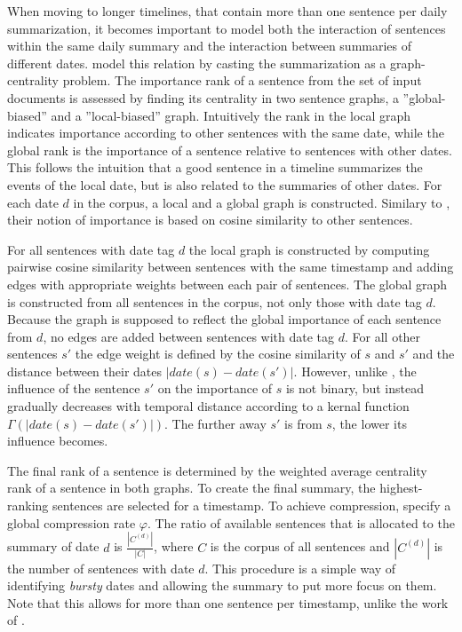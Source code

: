 \documentclass[a4paper,BCOR=10mm]{report}
\numberwithin{lemma}{chapter}
\numberwithin{definition}{chapter}
\begin{document}
When moving to longer timelines, that contain more than one sentence per daily summarization, it becomes important to model both the interaction of sentences within the same daily summary and the interaction between summaries of different dates.
\citet{yan-trans} model this relation by casting the summarization as a graph-centrality problem.
The importance rank of a sentence from the set of input documents is assessed by finding its centrality in two sentence graphs, a ''global-biased'' and a ''local-biased'' graph.
Intuitively the rank in the local graph indicates importance according to other sentences with the same date, while the global rank is the importance of a sentence relative to sentences with other dates. This follows the intuition that a good sentence in a timeline summarizes the events of the local date, but is also related to the summaries of other dates. For each date $d$ in the corpus, a local and a global graph is constructed.
Similary to \citet{chieu}, their notion of importance is based on cosine similarity to other sentences.

For all sentences with date tag $d$ the local graph is constructed by computing pairwise cosine similarity between sentences with the same timestamp and adding edges with appropriate weights between each pair of sentences.
The global graph is constructed from all sentences in the corpus, not only those with date tag $d$. Because the graph is supposed to reflect the global importance of each sentence from $d$, no edges are added between sentences with date tag $d$.
For all other sentences $s'$ the edge weight is defined by the cosine similarity of $s$ and $s'$ and the distance between their dates $|\mathit{date}(s) - \mathit{date}(s')|$. However, unlike \citet{chieu}, the influence of the sentence $s'$ on the importance of $s$ is not binary, but instead gradually decreases with temporal distance according to a kernal function $\Gamma(|\mathit{date}(s) - \mathit{date}(s')|)$. The further away $s'$ is from $s$, the lower its influence becomes.

The final rank of a sentence is determined by the weighted average centrality rank of a sentence in both graphs.
To create the final summary, the highest-ranking sentences are selected for a timestamp. To achieve compression, \citeauthor{yan-trans} specify a global compression rate $\varphi$. The ratio of available sentences that is allocated to the summary of date $d$ is $\frac{|C^{(d)}|}{|C|}$, where $C$ is the corpus of all sentences and $|C^{(d)}|$ is the number of sentences with date $d$.
This procedure is a simple way of identifying \textit{bursty} dates and allowing the summary to put more focus on them.
Note that this allows for more than one sentence per timestamp, unlike the work of \citet{chieu}.
\end{document}
